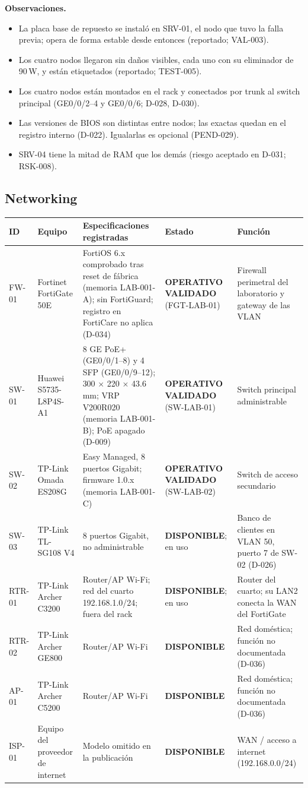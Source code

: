 \documentclass[11pt,a4paper]{article}
\newcommand{\estadobase}[2]{\textcolor{#1}{\textbf{\footnotesize #2}}}
\newcommand{\disp}{\estadobase{okgreen}{DISPONIBLE}}
\newcommand{\opval}{\estadobase{okgreen}{OPERATIVO VALIDADO}}
\begin{document}
\textbf{Observaciones.}
\begin{itemize}
  \item La placa base de repuesto se instaló en SRV-01, el nodo que tuvo la falla previa; opera de forma estable desde entonces (reportado; VAL-003).
  \item Los cuatro nodos llegaron sin daños visibles, cada uno con su eliminador de 90\,W, y están etiquetados (reportado; TEST-005).
  \item Los cuatro nodos están montados en el rack y conectados por trunk al switch principal (GE0/0/2--4 y GE0/0/6; D-028, D-030).
  \item Las versiones de BIOS son distintas entre nodos; las exactas quedan en el registro interno (D-022). Igualarlas es opcional (PEND-029).
  \item SRV-04 tiene la mitad de RAM que los demás (riesgo aceptado en D-031; RSK-008).
\end{itemize}

\subsection{Networking}
{\small
\begin{longtable}{L{1.5cm} L{3.0cm} L{3.9cm} L{2.8cm} L{3.0cm}}
  \toprule
  \textbf{ID} & \textbf{Equipo} & \textbf{Especificaciones registradas} & \textbf{Estado} & \textbf{Función}\\
  \midrule
  \endhead
  FW-01 & Fortinet FortiGate 50E & FortiOS 6.x comprobado tras reset de fábrica (memoria LAB-001-A); sin FortiGuard; registro en FortiCare no aplica (D-034) & \opval{} (FGT-LAB-01) & Firewall perimetral del laboratorio y gateway de las VLAN\\
  SW-01 & Huawei S5735-L8P4S-A1 & 8 GE PoE+ (GE0/0/1--8) y 4 SFP (GE0/0/9--12); 300 $\times$ 220 $\times$ 43.6\,mm; VRP V200R020 (memoria LAB-001-B); PoE apagado (D-009) & \opval{} (SW-LAB-01) & Switch principal administrable\\
  SW-02 & TP-Link Omada ES208G & Easy Managed, 8 puertos Gigabit; firmware 1.0.x (memoria LAB-001-C) & \opval{} (SW-LAB-02) & Switch de acceso secundario\\
  SW-03 & TP-Link TL-SG108 V4 & 8 puertos Gigabit, no administrable & \disp; en uso & Banco de clientes en VLAN 50, puerto 7 de SW-02 (D-026)\\
  RTR-01 & TP-Link Archer C3200 & Router/AP Wi-Fi; red del cuarto 192.168.1.0/24; fuera del rack & \disp; en uso & Router del cuarto; su LAN2 conecta la WAN del FortiGate\\
  RTR-02 & TP-Link Archer GE800 & Router/AP Wi-Fi & \disp & Red doméstica; función no documentada (D-036)\\
  AP-01 & TP-Link Archer C5200 & Router/AP Wi-Fi & \disp & Red doméstica; función no documentada (D-036)\\
  ISP-01 & Equipo del proveedor de internet & Modelo omitido en la publicación & \disp & WAN / acceso a internet (192.168.0.0/24)\\
  \bottomrule
\end{longtable}
}
\end{document}

